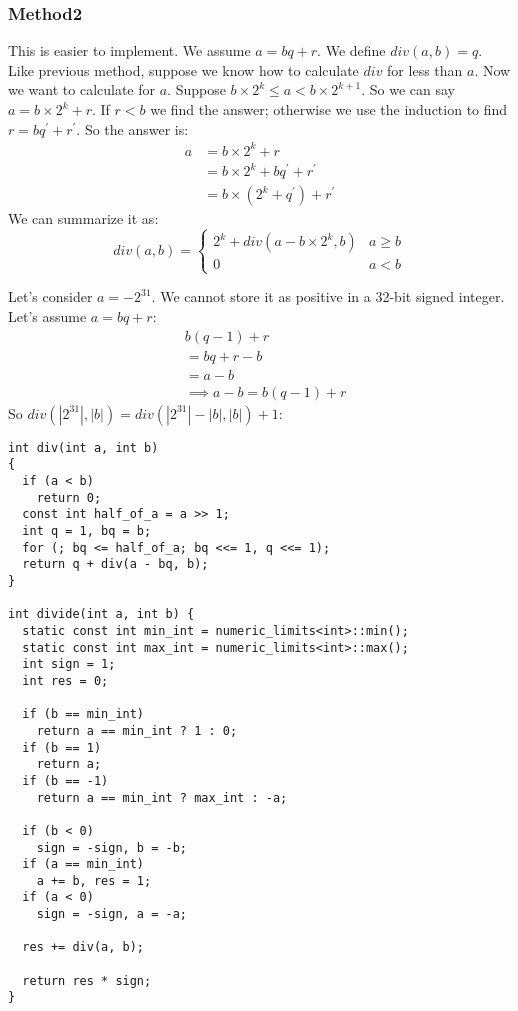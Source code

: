 \documentclass{book}
\begin{document}
	\subsubsection{Method2}
	This is easier to implement. We assume $a = bq + r$. We define $div(a, b) = q$. Like previous method, suppose we know how to calculate $div$ for less than $a$. Now we want to calculate for $a$. Suppose $b \times 2^k \le a < b \times 2^{k + 1}$. So we can say $a = b \times 2^k + r$. If $r < b$ we find the answer; otherwise we use the induction to find $r = bq^{\prime} + r^{\prime}$. So the answer is:
	\begin{equation*}
		\begin{split}
			a &= b \times 2^k + r \\
			  &= b \times 2^k + bq^{\prime} + r^{\prime} \\
			  &= b \times (2^k + q^\prime) + r^{\prime}
		\end{split}
	\end{equation*}
	We can summarize it as:
	\begin{equation*}
		div(a, b) = \begin{cases}
			2^k + div(a - b \times 2^k, b) & a \ge b \\
			0 & a < b
		\end{cases}
	\end{equation*}
	\par Let's consider $a=-2^{31}$. We cannot store it as positive in a 32-bit signed integer. Let's assume $a = bq + r$:
	\begin{equation*}
		\begin{split}
			&b(q - 1) + r \\
			&= bq + r - b \\
			&= a - b \\
			&\implies a - b = b(q - 1) + r
		\end{split}
	\end{equation*}
	So $div(|2^{31}|, |b|) = div(|2^{31}| - |b|, |b|) + 1$:
	\begin{lstlisting}
int div(int a, int b)
{
  if (a < b)
    return 0;        
  const int half_of_a = a >> 1;
  int q = 1, bq = b;
  for (; bq <= half_of_a; bq <<= 1, q <<= 1);
  return q + div(a - bq, b);
}

int divide(int a, int b) {
  static const int min_int = numeric_limits<int>::min();
  static const int max_int = numeric_limits<int>::max();
  int sign = 1;
  int res = 0;
  
  if (b == min_int)
    return a == min_int ? 1 : 0;
  if (b == 1)
    return a;
  if (b == -1)
    return a == min_int ? max_int : -a;
  
  if (b < 0)
    sign = -sign, b = -b;
  if (a == min_int)
    a += b, res = 1;
  if (a < 0)
    sign = -sign, a = -a;
  
  res += div(a, b);

  return res * sign;
}
	\end{lstlisting}
\end{document}
